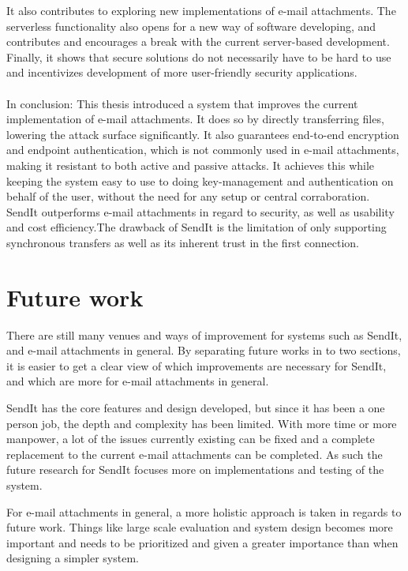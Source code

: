 It also contributes to exploring new implementations of e-mail attachments. The serverless functionality also opens for a new way of software developing, and contributes and encourages a break with the current server-based development. Finally, it shows that secure solutions do not necessarily have to be hard to use and incentivizes development of more user-friendly security applications.
%
\paragraph{}
%
In conclusion: This thesis introduced a system that improves the current implementation of e-mail attachments. It does so by directly transferring files, lowering the attack surface significantly. It also guarantees end-to-end encryption and endpoint authentication, which is not commonly used in e-mail attachments, making it resistant to both active and passive attacks. It achieves this while keeping the system easy to use to doing key-management and authentication on behalf of the user, without the need for any setup or central corraboration. SendIt outperforms e-mail attachments in regard to security, as well as usability and cost efficiency.The drawback of SendIt is the limitation of only supporting synchronous transfers as well as its inherent trust in the first connection.
%
\section{Future work}
%
There are still many venues and ways of improvement for systems such as SendIt, and e-mail attachments in general. By separating future works in to two sections, it is easier to get a clear view of which improvements are necessary for SendIt, and which are more for e-mail attachments in general.

SendIt has the core features and design developed, but since it has been a one person job, the depth and complexity has been limited. With more time or more manpower, a lot of the issues currently existing can be fixed and a complete replacement to the current e-mail attachments can be completed. As such the future research for SendIt focuses more on implementations and testing of the system.

For e-mail attachments in general, a more holistic approach is taken in regards to future work. Things like large scale evaluation and system design becomes more important and needs to be prioritized and given a greater importance than when designing a simpler system.
%
